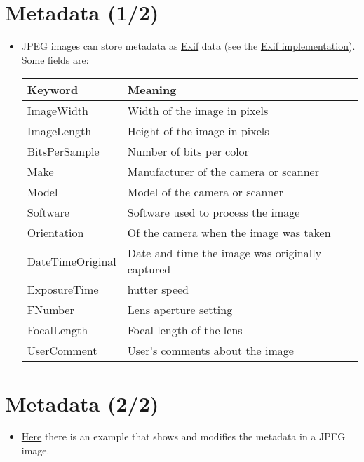 \section{Metadata (1/2)}
\begin{itemize}
\item \gls{JPEG} images can store metadata as
  \href{https://en.wikipedia.org/wiki/Exif}{Exif} data (see the \href{https://gitlab.com/TNThieding/exif/-/blob/master/docs/api_reference.rst?ref_type=heads}{Exif implementation}). Some fields are:
  \vspace{-2ex}
  \begin{center}
    \begin{tabular}{l|l}
      Keyword & Meaning\\
      \hline
      ImageWidth & Width of the image in pixels \\
      ImageLength & Height of the image in pixels \\
      BitsPerSample&  Number of bits per color \\
      Make & Manufacturer of the camera or scanner \\
      Model & Model of the camera or scanner \\
      Software & Software used to process the image \\
      Orientation & Of the camera when the image was taken \\
      DateTimeOriginal & Date and time the image was originally captured \\
      ExposureTime & hutter speed \\
      FNumber & Lens aperture setting \\
      FocalLength & Focal length of the lens \\
      UserComment & User's comments about the image
    \end{tabular}
  \end{center}
\end{itemize}

\section*{Metadata (2/2)}
\begin{itemize}
\item
  \href{https://github.com/vicente-gonzalez-ruiz/medical_imaging/blob/main/notebooks/JPEG_add_metadata.ipynb}{Here}
  there is an example that shows and modifies the metadata in a JPEG
  image.
\end{itemize}
